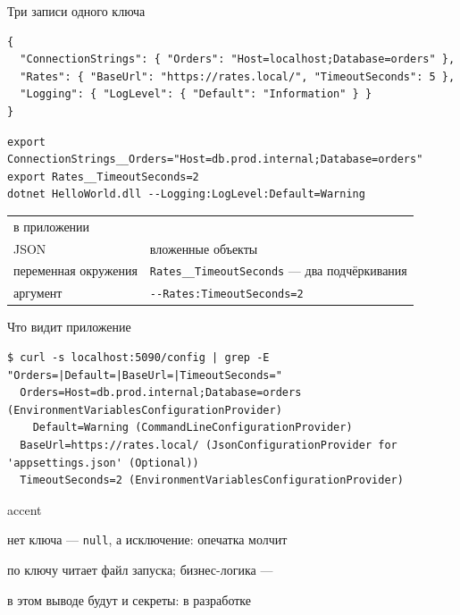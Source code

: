 \documentclass[aspectratio=169,10pt,t]{beamer}
\newcommand{\codexs}{\ttfamily\fontsize{7.0}{8.3}\selectfont}
\newcommand{\termsm}{\ttfamily\fontsize{6.6}{7.9}\selectfont}
\begin{document}
\begin{frame}[fragile]{Три записи одного ключа}
  \slidetop
\begin{lstlisting}[style=json,basicstyle=\codexs]
{
  "ConnectionStrings": { "Orders": "Host=localhost;Database=orders" },
  "Rates": { "BaseUrl": "https://rates.local/", "TimeoutSeconds": 5 },
  "Logging": { "LogLevel": { "Default": "Information" } }
}
\end{lstlisting}

\begin{lstlisting}[style=bash,basicstyle=\codexs]
export ConnectionStrings__Orders="Host=db.prod.internal;Database=orders"
export Rates__TimeoutSeconds=2
dotnet HelloWorld.dll --Logging:LogLevel:Default=Warning
\end{lstlisting}

  {\renewcommand{\arraystretch}{1.25}\small
  \begin{tabular}{@{}L{3.6cm}L{9.2cm}@{}}
    в приложении          &  \\
    JSON                  & вложенные объекты \\
    переменная окружения  & \texttt{Rates\_\_TimeoutSeconds} --- два подчёркивания \\
    аргумент              & \texttt{-{}-Rates:TimeoutSeconds=2} \\
  \end{tabular}}
\end{frame}

\begin{frame}[fragile]{Что видит приложение}
  \slidetop

\begin{lstlisting}[style=term,basicstyle=\termsm]
$ curl -s localhost:5090/config | grep -E "Orders=|Default=|BaseUrl=|TimeoutSeconds="
  Orders=Host=db.prod.internal;Database=orders (EnvironmentVariablesConfigurationProvider)
    Default=Warning (CommandLineConfigurationProvider)
  BaseUrl=https://rates.local/ (JsonConfigurationProvider for 'appsettings.json' (Optional))
  TimeoutSeconds=2 (EnvironmentVariablesConfigurationProvider)
\end{lstlisting}

  \slidegap
  \begin{cbul}{accent}
    \item нет ключа --- \texttt{null}, а  исключение: опечатка молчит
    \item по ключу читает файл запуска; бизнес-логика --- 
    \item в этом выводе будут и секреты:  в разработке
  \end{cbul}
\end{frame}
\end{document}
